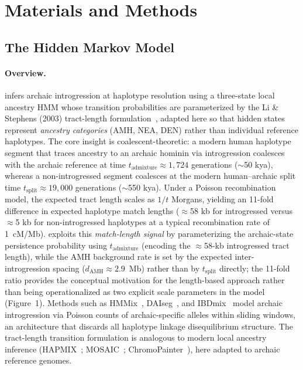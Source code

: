 \section*{Materials and Methods}

\subsection*{The \AP{} Hidden Markov Model}

\paragraph{Overview.}
\AP{} infers archaic introgression at haplotype resolution using a three-state
local ancestry HMM whose transition probabilities are parameterized by
the Li \& Stephens (2003) tract-length formulation~\citep{li2003modeling},
adapted here so that hidden states represent \emph{ancestry categories}
(AMH, NEA, DEN) rather than individual reference haplotypes.
The core insight is coalescent-theoretic: a modern human haplotype segment that traces
ancestry to an archaic hominin via introgression coalesces with the archaic reference
at time $t_\mathrm{admixture} \approx 1{,}724$ generations ($\sim$50 kya), whereas a
non-introgressed segment coalesces at the modern human--archaic split time
$t_\mathrm{split} \approx 19{,}000$ generations ($\sim$550 kya).
Under a Poisson recombination model, the expected tract length scales as $1/t$ Morgans,
yielding an 11-fold difference in expected haplotype match lengths
($\approx$58 kb for introgressed versus $\approx$5 kb for non-introgressed haplotypes
at a typical recombination rate of 1~cM/Mb).
\AP{} exploits this \emph{match-length signal} by parameterizing the
archaic-state persistence probability using $t_\mathrm{admixture}$
(encoding the $\approx$58-kb introgressed tract length),
while the AMH background rate is set by the expected inter-introgression
spacing ($d_\mathrm{AMH} \approx 2.9$~Mb) rather than by $t_\mathrm{split}$
directly; the 11-fold ratio provides the conceptual motivation for the
length-based approach rather than being operationalized as two explicit
scale parameters in the model (Figure~1).
Methods such as HMMix~\citep{skov2018detecting}, DAIseg~\citep{planche2024daiseg},
and IBDmix~\citep{chen2020identifying} model archaic introgression via Poisson
counts of archaic-specific alleles within sliding windows, an architecture that
discards all haplotype linkage disequilibrium structure.
The tract-length transition formulation is analogous to modern local ancestry
inference (HAPMIX~\citep{price2009sensitive};
MOSAIC~\citep{salter2019mosaic}; ChromoPainter~\citep{lawson2012inference}),
here adapted to archaic reference genomes.

